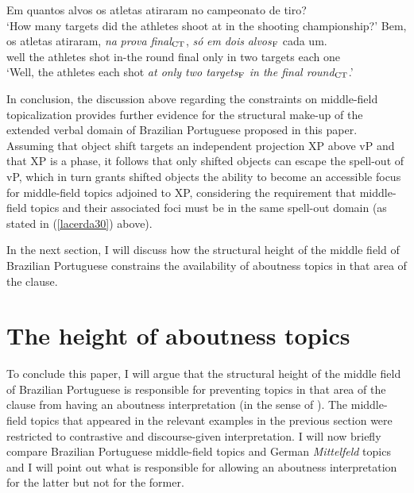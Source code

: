 \documentclass[output=paper]{langscibook}
\begin{document}
\begin{exe}
\ex \label{lacerda34}
\begin{xlist}
 \label{lacerda34A}
Em quantos alvos os atletas atiraram no campeonato de tiro?\\
‘How many targets did the athletes shoot at in the shooting championship?’	
 \label{lacerda34B}
\gll Bem,	os 	atletas 	atiraram, 	\emph{na} 	\emph{prova} 	\emph{final}$_{\textnormal{CT}}$, 	\emph{só} 	\emph{em} 	\emph{dois} 	\emph{alvos}$_{\textnormal{F}}$ 	cada 	um.\\
well 	the 	athletes 	shot 	in-the 	round 	final 	only 	in 	two 	targets	each	one\\
\glt ‘Well, the athletes each shot \emph{at only two targets$_{\textnormal{F}}$ in the final round}$_{\textnormal{CT}}$.’
\end{xlist}

\end{exe}

In conclusion, the discussion above regarding the constraints on middle-field topicalization provides further evidence for the structural make-up of the extended verbal domain of Brazilian Portuguese proposed in this paper. Assuming that object shift targets an independent projection XP above vP and that XP is a phase, it follows that only shifted objects can escape the spell-out of vP, which in turn grants shifted objects the ability to become an accessible focus for middle-field topics adjoined to XP, considering the requirement that middle-field topics and their associated foci must be in the same spell-out domain (as stated in (\ref{lacerda30}) above).

In the next section, I will discuss how the structural height of the middle field of Brazilian Portuguese constrains the availability of aboutness topics in that area of the clause.

\section{The height of aboutness topics}
To conclude this paper, I will argue that the structural height of the middle field of Brazilian Portuguese is responsible for preventing topics in that area of the clause from having an aboutness interpretation (in the sense of \citealt{Reinhart1981}). The middle-field topics that appeared in the relevant examples in the previous section were restricted to contrastive and discourse-given interpretation. I will now briefly compare Brazilian Portuguese middle-field topics and German \emph{Mittelfeld} topics and I will point out what is responsible for allowing an aboutness interpretation for the latter but not for the former.
\end{document}
